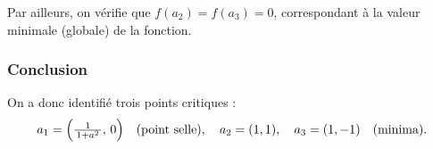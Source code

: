 \documentclass[10pt]{article}
\begin{document}
Par ailleurs, on vérifie que \(f(a_2) = f(a_3) = 0\), correspondant à la valeur minimale (globale) de la fonction.

\subsubsection*{Conclusion}

On a donc identifié trois points critiques : 
\[
  a_1 = \Bigl(\tfrac{1}{\,1+a^2\,},\,0\Bigr)\quad(\text{point selle}),\quad
  a_2 = (1,1),\quad
  a_3 = (1,-1)\quad(\text{minima}).
\]
\end{document}
